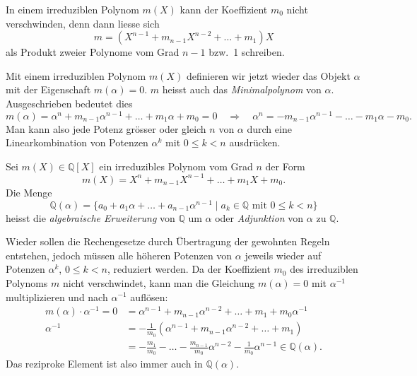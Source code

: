 In einem irreduziblen Polynom $m(X)$ kann der Koeffizient $m_0$ nicht
verschwinden, denn dann liesse sich
\[
m
=
(X^{n-1} + m_{n-1}X^{n-2}+\dots + m_1)X
\]
als Produkt zweier Polynome vom Grad $n-1$ bzw.~1 schreiben.

Mit einem irreduziblen Polynom $m(X)$ definieren wir jetzt wieder das
Objekt $\alpha$ mit der Eigenschaft $m(\alpha)=0$.
$m$ heisst auch das \emph{Minimalpolynom} von $\alpha$.
%
Ausgeschrieben bedeutet dies
\[
m(\alpha)
=
\alpha^n
+
m_{n-1}\alpha^{n-1}
+
\dots
+
m_1\alpha
+
m_0
=
0
\quad\Rightarrow\quad
\alpha^n
=
-m_{n-1}\alpha^{n-1}
-
\dots
-
m_1\alpha
-
m_0.
\]
Man kann also jede Potenz grösser oder gleich $n$ von $\alpha$ durch
eine Linearkombination von Potenzen $\alpha^k$ mit $0\le k< n$ 
ausdrücken.

\begin{definition}
Sei $m(X)\in\mathbb{Q}[X]$ ein irreduzibles Polynom vom Grad $n$
der Form
\[
m(X)
=
X^n + m_{n-1}X^{n-1} + \dots + m_1X + m_0.
\]
Die Menge
\begin{equation}
\mathbb{Q}(\alpha)
=
\{
a_0 + a_1\alpha + \dots + a_{n-1}\alpha^{n-1}
\mid
a_k\in\mathbb{Q}\text{ mit } 0\le k<n
\}
\label{buch:komplex:zahlen:def:eqn:Qa}
\end{equation}
heisst die \emph{algebraische Erweiterung} von $\mathbb{Q}$ um $\alpha$
oder \emph{Adjunktion} von $\alpha$ zu $\mathbb{Q}$.
%
%
%
\end{definition}

Wieder sollen die Rechengesetze durch Übertragung der gewohnten
Regeln entstehen, jedoch müssen alle höheren Potenzen von $\alpha$
jeweils wieder auf Potenzen $\alpha^k$, $0\le k<n$, reduziert werden.
Da der Koeffizient $m_0$ des irreduziblen Polynoms $m$ nicht verschwindet,
kann man die Gleichung $m(\alpha) = 0$ mit $\alpha^{-1}$ multiplizieren
und nach $\alpha^{-1}$ auflösen:
\begin{align*}
m(\alpha)\cdot \alpha^{-1}
=
0
&=
\alpha^{n-1}
+
m_{n-1}\alpha^{n-2}
+
\dots
+
m_1
+
m_0\alpha^{-1}
\\
\alpha^{-1}
&=
-\frac{1}{m_0}
(
\alpha^{n-1}
+
m_{n-1}\alpha^{n-2}
+
\dots
+
m_1
)
\\
&=
-\frac{m_1}{m_0}
-\dots
-\frac{m_{n-1}}{m_0}\alpha^{n-2}
-\frac{1}{m_0}\alpha^{n-1}
\in
\mathbb{Q}(\alpha).
\end{align*}
Das reziproke Element ist also immer auch in $\mathbb{Q}(\alpha)$.
%

